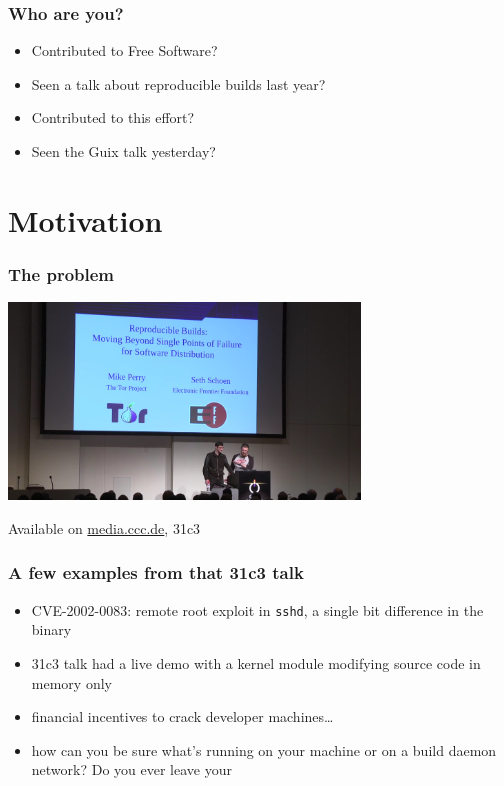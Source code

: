 \documentclass[14pt]{beamer}
\begin{document}
\begin{frame}
 \frametitle{Who are you?}
 \begin{itemize}
  \item Contributed to Free Software?
  \item<2-4> Seen a talk about reproducible builds last year?
  \item<3-4> Contributed to this effort?
  \item<4> Seen the Guix talk yesterday?
 \end{itemize}
\end{frame}

\section{Motivation}

\begin{frame}
 \frametitle{The problem}

 \begin{center}
  \includegraphics[width=0.7\textwidth]{images/31c3.png}

  Available on \url{media.ccc.de}, 31c3
 \end{center}
\end{frame}

\begin{frame}[fragile]
 \frametitle{A few examples from that 31c3 talk}
 \begin{itemize}
  \item CVE-2002-0083: remote root exploit in \texttt{sshd}, a single bit difference in the binary
  \item<2-5> 31c3 talk had a live demo with a kernel module modifying source code in memory only
  \item<3-5> financial incentives to crack developer machines…
  \item<4-5> {how can you be sure what's running on your machine or on a build
  daemon network? Do you ever leave your} 
 \end{itemize}
\end{frame}
\end{document}
